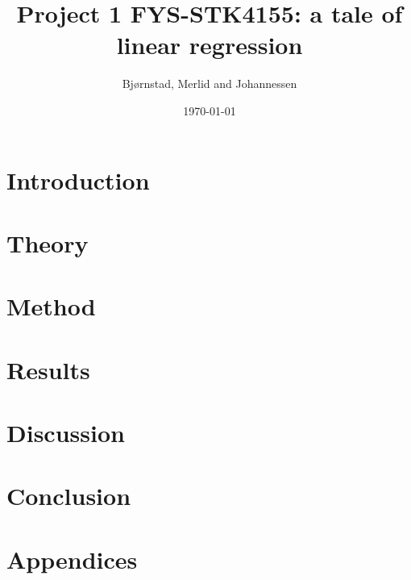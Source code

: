 \documentclass[aps,rmp,reprint,amsmath,amssymb,twocolumn,floatfix]{revtex4-1}
\begin{document}
\title{Project 1 FYS-STK4155: a tale of linear regression}

\author{Bjørnstad, Merlid and Johannessen}
\date{\today}


\begin{abstract}

\end{abstract}
\maketitle

\tableofcontents

\section{Introduction}
\label{sec:introduction}

\section{Theory}


\section{Method}


\section{Results}


\section{Discussion}


\section{Conclusion}


\newpage
{}

\appendix
\section{Appendices}
\label{appendix}

\end{document}
